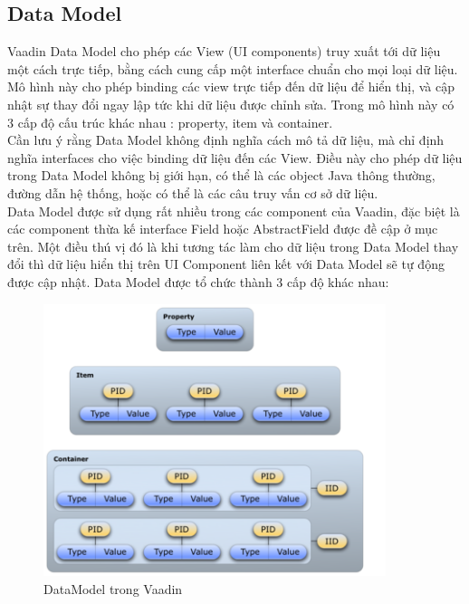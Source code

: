 \subsection{Data Model}
Vaadin Data Model cho phép các View (UI components) truy xuất tới dữ liệu một cách trực tiếp, bằng cách cung cấp một interface chuẩn cho mọi loại dữ liệu. Mô hình này cho phép binding các view trực tiếp đến dữ liệu để hiển thị, và cập nhật sự thay đổi ngay lập tức khi dữ liệu được chỉnh sửa. Trong mô hình này có 3 cấp độ cấu trúc khác nhau : property, item và container.
\\
Cần lưu ý rằng Data Model không định nghĩa cách mô tả dữ liệu, mà chỉ định nghĩa interfaces cho việc binding dữ liệu đến các View. Điều này cho phép dữ liệu trong Data Model không bị giới hạn, có thể là các object Java thông thường, đường dẫn hệ thống, hoặc có thể là các câu truy vấn cơ sở dữ liệu.
\\
Data Model được sử dụng rất nhiều trong các component của Vaadin, đặc biệt là các component thừa kế interface Field hoặc AbstractField được đề cập ở mục trên. Một điều thú vị đó là khi tương tác làm cho dữ liệu trong Data Model thay đổi thì dữ liệu hiển thị trên UI Component liên kết với Data Model sẽ tự động được cập nhật. Data Model được tổ chức thành 3 cấp độ khác nhau:
\begin{figure}[h!]
	\centering
	\includegraphics[width=100mm]{Figures/vaadin_datamodel.png}
	\caption{DataModel trong Vaadin\label{overflow}}
\end{figure}
